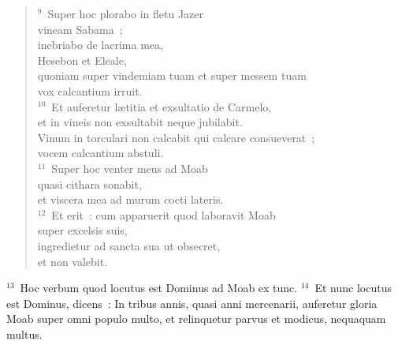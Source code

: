 \begin{flushleft}
\begin{verse}
${}^{9}$~Super hoc plorabo in fletu Jazer\\ vineam Sabama~;\\ inebriabo de lacrima mea,\\ Hesebon et Eleale,\\ quoniam super vindemiam tuam et super messem tuam\\ vox calcantium irruit.\\
${}^{10}$~Et auferetur l\ae titia et exsultatio de Carmelo,\\ et in vineis non exsultabit neque jubilabit.\\ Vinum in torculari non calcabit qui calcare consueverat~;\\ vocem calcantium abstuli.\\
${}^{11}$~Super hoc venter meus ad Moab\\ quasi cithara sonabit,\\ et viscera mea ad murum cocti lateris.\\
${}^{12}$~Et erit~: cum apparuerit quod laboravit Moab\\ super excelsis suis,\\ ingredietur ad sancta sua ut obsecret,\\ et non valebit.\end{verse}\end{flushleft}


${}^{13}$~Hoc verbum quod locutus est Dominus ad Moab ex tunc.
${}^{14}$~Et nunc locutus est Dominus, dicens~: In tribus annis, quasi anni mercenarii, auferetur gloria Moab super omni populo multo, et relinquetur parvus et modicus, nequaquam multus.

